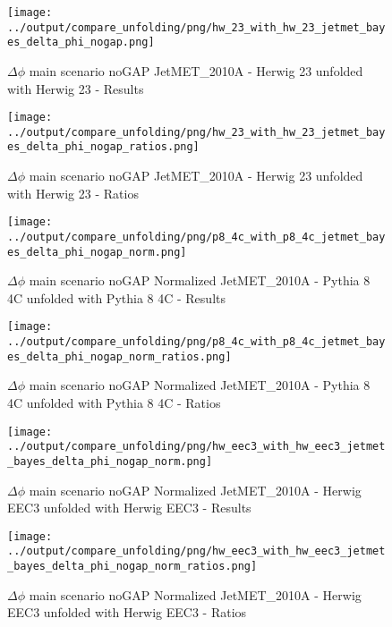 \documentclass[11pt]{book}
\begin{document}
\begin{figure}[ht]
\centering
\texttt{[image: ../output/compare\_unfolding/png/hw\_23\_with\_hw\_23\_jetmet\_bayes\_delta\_phi\_nogap.png]}
\caption{$\Delta\phi$ main scenario noGAP JetMET\_2010A - Herwig 23 unfolded with Herwig 23 - Results}
\label{hw_23_hw_23_jetmet_bayes_delta_phi_nogap_a}
\end{figure}

\begin{figure}[ht]
\centering
\texttt{[image: ../output/compare\_unfolding/png/hw\_23\_with\_hw\_23\_jetmet\_bayes\_delta\_phi\_nogap\_ratios.png]}
\caption{$\Delta\phi$ main scenario noGAP JetMET\_2010A - Herwig 23 unfolded with Herwig 23 - Ratios}
\label{hw_23_hw_23_jetmet_bayes_delta_phi_nogap_b}
\end{figure}

\begin{figure}[ht]
\centering
\texttt{[image: ../output/compare\_unfolding/png/p8\_4c\_with\_p8\_4c\_jetmet\_bayes\_delta\_phi\_nogap\_norm.png]}
\caption{$\Delta\phi$ main scenario noGAP Normalized JetMET\_2010A - Pythia 8 4C unfolded with Pythia 8 4C - Results}
\label{p8_p8_jetmet_bayes_delta_phi_nogap_norm_a}
\end{figure}

\begin{figure}[ht]
\centering
\texttt{[image: ../output/compare\_unfolding/png/p8\_4c\_with\_p8\_4c\_jetmet\_bayes\_delta\_phi\_nogap\_norm\_ratios.png]}
\caption{$\Delta\phi$ main scenario noGAP Normalized JetMET\_2010A - Pythia 8 4C unfolded with Pythia 8 4C - Ratios}
\label{p8_p8_jetmet_bayes_delta_phi_nogap_norm_b}
\end{figure}

\begin{figure}[ht]
\centering
\texttt{[image: ../output/compare\_unfolding/png/hw\_eec3\_with\_hw\_eec3\_jetmet\_bayes\_delta\_phi\_nogap\_norm.png]}
\caption{$\Delta\phi$ main scenario noGAP Normalized JetMET\_2010A - Herwig EEC3 unfolded with Herwig EEC3 - Results}
\label{hw_eec3_hw_eec3_jetmet_bayes_delta_phi_nogap_norm_a}
\end{figure}

\begin{figure}[ht]
\centering
\texttt{[image: ../output/compare\_unfolding/png/hw\_eec3\_with\_hw\_eec3\_jetmet\_bayes\_delta\_phi\_nogap\_norm\_ratios.png]}
\caption{$\Delta\phi$ main scenario noGAP Normalized JetMET\_2010A - Herwig EEC3 unfolded with Herwig EEC3 - Ratios}
\label{hw_eec3_hw_eec3_jetmet_bayes_delta_phi_nogap_norm_b}
\end{figure}
\end{document}
